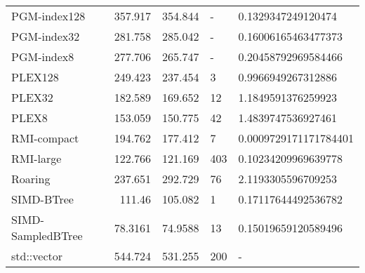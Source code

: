 \begin{tabular}{lrrll}
 PGM-index128      &               357.917  &              354.844  & -            & 0.1329347249120474    \\
 PGM-index32       &               281.758  &              285.042  & -            & 0.16006165463477373   \\
 PGM-index8        &               277.706  &              265.747  & -            & 0.20458792969584466   \\
 PLEX128           &               249.423  &              237.454  & 3            & 0.9966949267312886    \\
 PLEX32            &               182.589  &              169.652  & 12           & 1.1849591376259923    \\
 PLEX8             &               153.059  &              150.775  & 42           & 1.4839747536927461    \\
 RMI-compact       &               194.762  &              177.412  & 7            & 0.0009729171171784401 \\
 RMI-large         &               122.766  &              121.169  & 403          & 0.10234209969639778   \\
 Roaring           &               237.651  &              292.729  & 76           & 2.1193305596709253    \\
 SIMD-BTree        &               111.46   &              105.082  & 1            & 0.17117644492536782   \\
 SIMD-SampledBTree &                78.3161 &               74.9588 & 13           & 0.15019659120589496   \\
 std::vector       &               544.724  &              531.255  & 200          & -                     \\
\hline
\end{tabular}